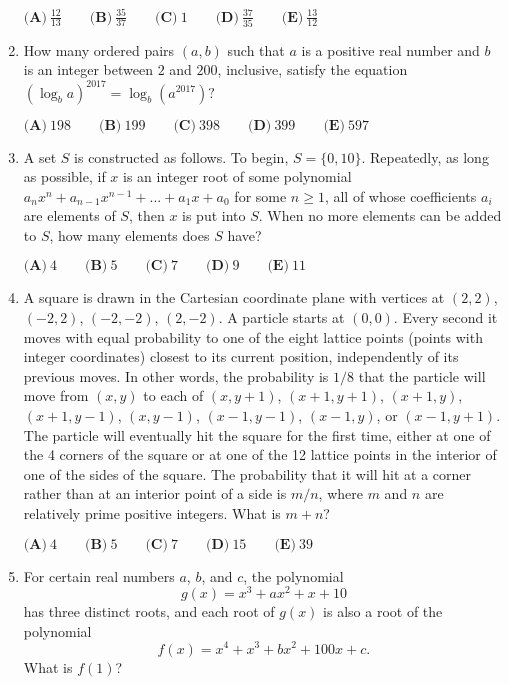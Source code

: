 \documentclass{article}
\begin{document}
\begin{enumerate}[label=\arabic*., itemsep=0.5em]
$\textbf{(A)}\ \frac{12}{13} \qquad \textbf{(B)}\ \frac{35}{37} \qquad\textbf{(C)}\ 1 \qquad\textbf{(D)}\ \frac{37}{35} \qquad\textbf{(E)}\ \frac{13}{12}$\par \vspace{0.5em}\item How many ordered pairs $(a,b)$ such that $a$ is a positive real number and $b$ is an integer between $2$ and $200$, inclusive, satisfy the equation $(\log_b a)^{2017}=\log_b(a^{2017})?$

$\textbf{(A)}\ 198\qquad\textbf{(B)}\ 199\qquad\textbf{(C)}\ 398\qquad\textbf{(D)}\ 399\qquad\textbf{(E)}\ 597$\par \vspace{0.5em}\item A set $S$ is constructed as follows. To begin, $S = \{0,10\}$. Repeatedly, as long as possible, if $x$ is an integer root of some polynomial $a_{n}x^n + a_{n-1}x^{n-1} + ... + a_{1}x + a_0$ for some $n\geq{1}$, all of whose coefficients $a_i$ are elements of $S$, then $x$ is put into $S$. When no more elements can be added to $S$, how many elements does $S$ have?

$\textbf{(A)}\ 4 \qquad \textbf{(B)}\ 5 \qquad\textbf{(C)}\ 7 \qquad\textbf{(D)}\ 9 \qquad\textbf{(E)}\ 11$\par \vspace{0.5em}\item A square is drawn in the Cartesian coordinate plane with vertices at $(2, 2)$, $(-2, 2)$, $(-2, -2)$, $(2, -2)$. A particle starts at $(0,0)$. Every second it moves with equal probability to one of the eight lattice points (points with integer coordinates) closest to its current position, independently of its previous moves. In other words, the probability is $1/8$ that the particle will move from $(x, y)$ to each of $(x, y + 1)$, $(x + 1, y + 1)$, $(x + 1, y)$, $(x + 1, y - 1)$, $(x, y - 1)$, $(x - 1, y - 1)$, $(x - 1, y)$, or $(x - 1, y + 1)$. The particle will eventually hit the square for the first time, either at one of the 4 corners of the square or at one of the 12 lattice points in the interior of one of the sides of the square. The probability that it will hit at a corner rather than at an interior point of a side is $m/n$, where $m$ and $n$ are relatively prime positive integers. What is $m + n$?

$\textbf{(A)}\ 4 \qquad \textbf{(B)}\ 5 \qquad\textbf{(C)}\ 7 \qquad\textbf{(D)}\ 15 \qquad\textbf{(E)}\ 39$\par \vspace{0.5em}\item For certain real numbers $a$, $b$, and $c$, the polynomial 
\begin{equation*}
g(x) = x^3 + ax^2 + x + 10
\end{equation*}
has three distinct roots, and each root of $g(x)$ is also a root of the polynomial 
\begin{equation*}
f(x) = x^4 + x^3 + bx^2 + 100x + c.
\end{equation*}
What is $f(1)$?


\end{enumerate}
\end{document}
